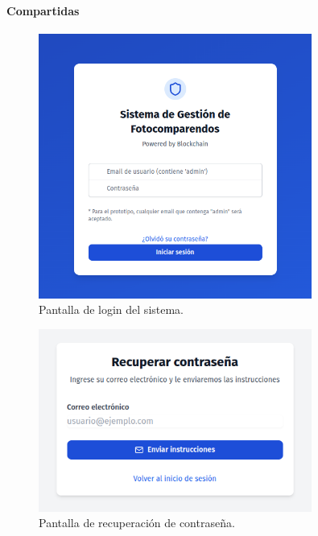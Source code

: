 \paragraph{Compartidas}
 \begin{figure}[htbp]
    \centering
    \includegraphics[width=0.8\textwidth]{Images/UI1.png}
    \caption{Pantalla de login del sistema.}
    \label{fig:login}
\end{figure}

 \begin{figure}[htbp]
    \centering
    \includegraphics[width=0.8\textwidth]{Images/UI2.png}
    \caption{Pantalla de recuperación de contraseña.}
    \label{fig:recuperar_password}
\end{figure}
